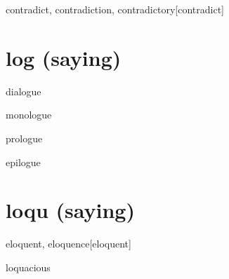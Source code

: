 \begin{RefWord}{contradict, contradiction, contradictory}[contradict]
\end{RefWord}

\section{log (saying)}

\begin{RefWord}{dialogue}
\end{RefWord}

\begin{RefWord}{monologue}
\end{RefWord}

\begin{RefWord}{prologue}
\end{RefWord}

\begin{RefWord}{epilogue}
\end{RefWord}

\section{loqu (saying)}

\begin{RefWord}{eloquent, eloquence}[eloquent]
\end{RefWord}

\begin{RefWord}{loquacious}
\end{RefWord}